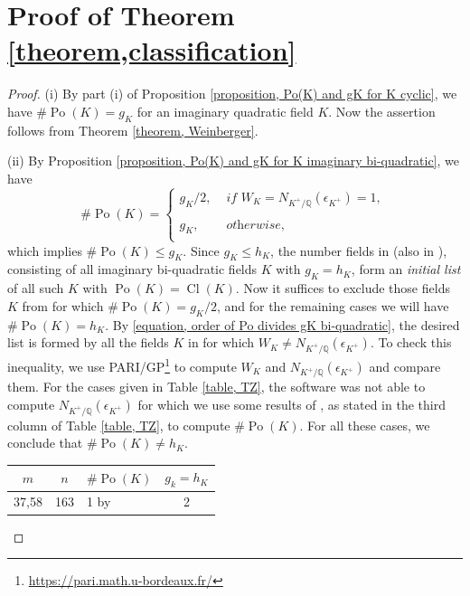 \documentclass[12pt]{amsart}
\theoremstyle{definition}
\numberwithin{equation}{section}
\DeclareMathOperator{\Po}{Po}
\DeclareMathOperator{\Cl}{Cl}
\begin{document}
\section{Proof of Theorem \ref{theorem,classification}}\label{four}
\begin{proof} 
(i) By part (i) of Proposition \ref{proposition, Po(K) and gK for K cyclic}, we have $\# \Po(K)=g_K$ for an imaginary quadratic field $K$. Now the assertion follows from Theorem \ref{theorem, Weinberger}.

(ii) By Proposition \ref{proposition, Po(K) and gK for K imaginary bi-quadratic}, we have
\begin{equation}  \label{equation, order of Po divides gK bi-quadratic}
	\# \Po(K) = \left\{
	\begin{array}{ll}
		g_K/2, \,  & \, \textit{if} \, \, W_K=N_{K^+/\mathbb{Q}}(\epsilon_{K^+})=1, \, \\
		& \\
		g_K, \, & \, \textit{otherwise,} \\	
	\end{array}
	\right.
\end{equation} 
which implies $\#\Po(K) \leq g_K$. Since $ g_K \leq h_K$,  the number fields in \cite[Table III]{CK} (also in \cite[Table 2]{Miyada}),
consisting of all  imaginary bi-quadratic fields $K$ with $g_K=h_K$, form an \emph{initial list} of all such $K$ with $\Po(K)=\Cl(K)$.  Now it suffices to exclude those fields $K$ from \cite[Table III]{CK}  for which $\#\Po(K)=g_K/2$, and for the remaining cases we will have $\#\Po(K)=h_K$. By \eqref{equation, order of Po divides gK bi-quadratic}, the desired list is formed by all the fields $K$ in \cite[Table III]{CK}  for which $W_K \neq N_{K^+/\mathbb{Q}}(\epsilon_{K^+})$. To check this inequality, we use PARI/GP\footnote{\url{https://pari.math.u-bordeaux.fr/}} to compute $W_K$ and $N_{K^+/\mathbb{Q}}(\epsilon_{K^+})$ and compare them.  For the cases given in Table \ref{table, TZ}, the software was not able to compute $N_{K^+/\mathbb{Q}}(\epsilon_{K^+})$ for which we use some results of \cite{TZ}, as stated in the third column of Table \ref{table, TZ}, to compute $\# \Po(K)$. For all these cases, we conclude that $\#\Po(K)\neq h_K$.
\begin{table}
\begin{center}
	\begin{tabular}{|c |c |l |c|} 
		\hline
		$m$ & $n$ & $\# \Po(K)$ & $g_k=h_K$ \\ [0.5ex] 
		\hline\hline
		37,58 & 163 & 1 by \cite[Theorem 5]{TZ} & 2 \\ 

\end{tabular}
\end{center}
\end{table}
\end{proof}
\end{document}
